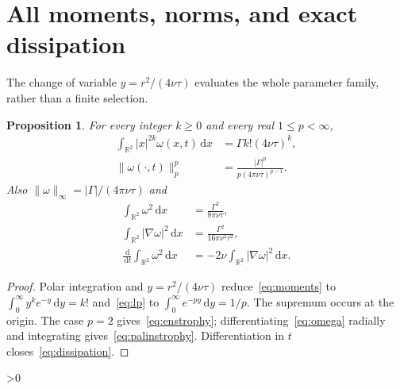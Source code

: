 \documentclass[10pt]{article}
\providecommand{\CRevisionRound}{2}
\newtheorem{proposition}{Proposition}
\newcommand{\R}{\mathbb R}
\newcommand{\dd}{\,\mathrm d}
\begin{document}
\section{All moments, norms, and exact dissipation}
The change of variable $y=r^2/(4\nu\tau)$ evaluates the whole parameter
family, rather than a finite selection.
\begin{proposition}\label{prop:norms}
For every integer $k\ge0$ and every real $1\le p<\infty$,
\begin{align}
 \int_{\R^2}|x|^{2k}\omega(x,t)\dd x
 &=\Gamma k!(4\nu\tau)^k,\label{eq:moments}\\
 \|\omega(\cdot,t)\|_p^p
 &=\frac{|\Gamma|^p}{p(4\pi\nu\tau)^{p-1}}.\label{eq:lp}
\end{align}
Also $\|\omega\|_\infty=|\Gamma|/(4\pi\nu\tau)$ and
\begin{align}
 \int_{\R^2}\omega^2\dd x&=\frac{\Gamma^2}{8\pi\nu\tau},
 \label{eq:enstrophy}\\
 \int_{\R^2}|\nabla\omega|^2\dd x&=
 \frac{\Gamma^2}{16\pi\nu^2\tau^2},\label{eq:palinstrophy}\\
 \frac{\dd}{\dd t}\int_{\R^2}\omega^2\dd x
 &=-2\nu\int_{\R^2}|\nabla\omega|^2\dd x.\label{eq:dissipation}
\end{align}
\end{proposition}
\begin{proof}
Polar integration and $y=r^2/(4\nu\tau)$ reduce~\eqref{eq:moments} to
$\int_0^\infty y^k e^{-y}\dd y=k!$ and~\eqref{eq:lp} to
$\int_0^\infty e^{-py}\dd y=1/p$.  The supremum occurs at the origin.
The case $p=2$ gives~\eqref{eq:enstrophy}; differentiating~\eqref{eq:omega}
radially and integrating gives~\eqref{eq:palinstrophy}.  Differentiation in
$t$ closes~\eqref{eq:dissipation}.
\end{proof}

\ifnum\CRevisionRound>0
\end{document}
